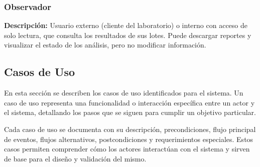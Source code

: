 \subsubsection{Observador}
\textbf{Descripción:} Usuario externo (cliente del laboratorio) o interno con acceso de solo lectura, que consulta los resultados de sus lotes. Puede descargar reportes y visualizar el estado de los análisis, pero no modificar información.

\clearpage

\subsection{Casos de Uso}
En esta sección se describen los casos de uso identificados para el sistema. Un caso de uso representa una funcionalidad o interacción específica entre un actor y el sistema, detallando los pasos que se siguen para cumplir un objetivo particular.

Cada caso de uso se documenta con su descripción, precondiciones, flujo principal de eventos, flujos alternativos, postcondiciones y requerimientos especiales. Estos casos permiten comprender cómo los actores interactúan con el sistema y sirven de base para el diseño y validación del mismo.



























